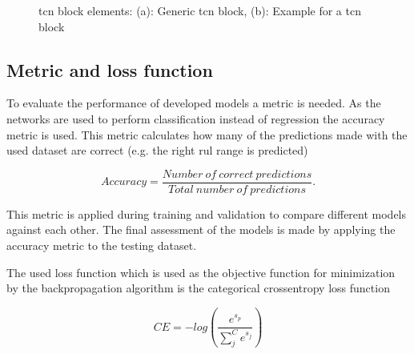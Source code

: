 \documentclass[conference]{IEEEtran}
\begin{document}
\begin{figure}[htp]
	\centering
	\quad
	\caption{\gls{tcn} block elements: (a): Generic \gls{tcn} block, (b): Example for a \gls{tcn} block \cite{Bai2018}}
	\label{fig:tcn_block}
\end{figure}

\subsection{Metric and loss function}
\label{sec:metric_and_loss_function}

To evaluate the performance of developed models a metric is needed. As the networks are used to perform classification instead of regression the accuracy metric is used. This metric calculates how many of the predictions made with the used dataset are correct (e.g. the right \gls{rul} range is predicted)

\begin{equation}
	\label{eq:accuracy_metric}
	Accuracy = \frac{Number \: of \: correct \: predictions}{Total \: number \: of \: predictions}.
\end{equation}

This metric is applied during training and validation to compare different models against each other. The final assessment of the models is made by applying the accuracy metric to the testing dataset.

The used loss function which is used as the objective function for minimization by the backpropagation algorithm is the categorical crossentropy loss function

\begin{equation}
	\label{eq:categorical-cross-entrophy}
	CE = -log(\frac{e^{s_p}}{\sum_{j}^{C} e^{s_j}})	
\end{equation}
\end{document}
